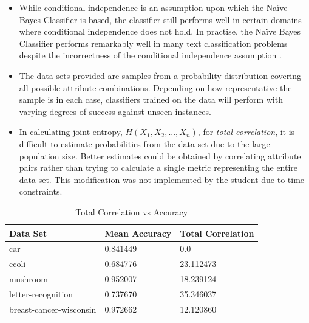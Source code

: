 \documentclass[10pt]{report}
\begin{document}
\begin{itemize}
  \item While conditional independence is an assumption upon which the
    Na\"{i}ve Bayes Classifier is based, the classifier still performs
    well in certain domains where conditional independence does not
    hold. In practise, the Na\"{i}ve Bayes Classifier performs
    remarkably well in many text classification problems despite the
    incorrectness of the conditional independence assumption
    \cite{Mitchell1997}. 

  \item The data sets provided are samples from a probability
    distribution covering all possible attribute
    combinations. Depending on how representative the sample is in
    each case, classifiers trained on the data will perform with
    varying degrees of success against unseen instances.

  \item In calculating joint entropy, \(H(X_1,X_2,...,X_n)\), for
    \textit{total correlation}, it is difficult to estimate
    probabilities from the data set due to the large population
    size. Better estimates could be obtained by correlating attribute
    pairs rather than trying to calculate a single metric
    representing the entire data set. This modification was not
    implemented by the student due to time constraints. 
\end{itemize}

\begin{table}[h]
  \centering
  \begin{tabular}{ |l|l|l|} 
    \hline
    \textbf{Data Set} & \textbf{Mean Accuracy} & \textbf{Total Correlation} \\ \hline
    car                      &  0.841449  &  0.0       \\ \hline
    ecoli                    &  0.684776  &  23.112473 \\ \hline
    mushroom                 &  0.952007  &  18.239124 \\ \hline
    letter-recognition       &  0.737670  &  35.346037 \\ \hline
    breast-cancer-wisconsin  &  0.972662  &  12.120860 \\ \hline
  \end{tabular}
  \caption{Total Correlation vs Accuracy}
  \label{tab:correlation}
\end{table}
\end{document}
